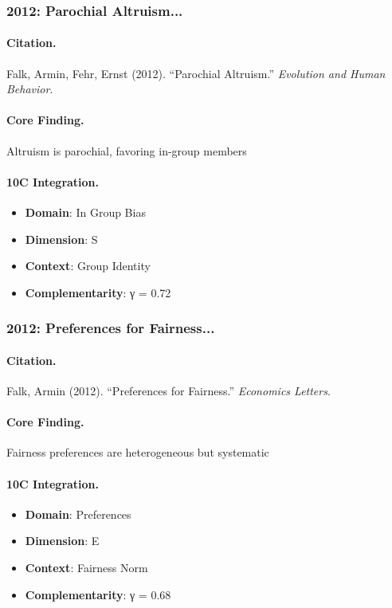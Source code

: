 \subsubsection{2012: Parochial Altruism...}

\paragraph{Citation.}
Falk, Armin, Fehr, Ernst (2012). ``Parochial Altruism.''
\textit{Evolution and Human Behavior}.

\paragraph{Core Finding.}
Altruism is parochial, favoring in-group members

\paragraph{10C Integration.}
\begin{itemize}[nosep]
  \item \textbf{Domain}: In Group Bias
  \item \textbf{Dimension}: S
  \item \textbf{Context}: Group Identity
  \item \textbf{Complementarity}: γ = 0.72
\end{itemize}


\subsubsection{2012: Preferences for Fairness...}

\paragraph{Citation.}
Falk, Armin (2012). ``Preferences for Fairness.''
\textit{Economics Letters}.

\paragraph{Core Finding.}
Fairness preferences are heterogeneous but systematic

\paragraph{10C Integration.}
\begin{itemize}[nosep]
  \item \textbf{Domain}: Preferences
  \item \textbf{Dimension}: E
  \item \textbf{Context}: Fairness Norm
  \item \textbf{Complementarity}: γ = 0.68
\end{itemize}


